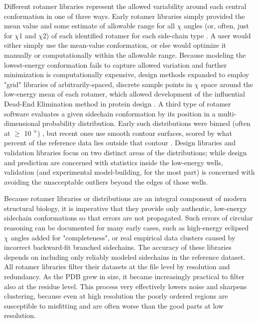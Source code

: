 Different rotamer libraries represent the allowed variability around each central conformation in one of three ways. Early rotamer libraries simply provided the mean value and some estimate of allowable range for all $\chi$ angles (or, often, just for $\chi$1 and $\chi$2) of each identified rotamer for each side-chain type \cite{Ponder1987, Tuffery1991,Schrauber1993}.  A user would either simply use the mean-value conformation, or else would optimize it manually or computationally within the allowable range. Because modeling the lowest-energy conformation fails to capture allowed variation and further minimization is computationally expensive, design methods expanded to employ "grid" libraries of arbitrarily-spaced, discrete sample points in $\chi$ space around the low-energy mean of each rotamer, which allowed development of the influential Dead-End Elimination method in protein design \cite{DeMaeyer1997,Gainza2013}.  A third type of rotamer software \cite{Chen:2010kx,Dunbrack1997} evaluates a given sidechain conformation by its position in a multi-dimensional probability distribution. Early such distributions were binned (often at $\ge$ 10 $\degree$) \cite{Laskowski:gl0276}, but recent ones use smooth contour surfaces, scored by what percent of the reference data lies outside that contour \cite{lovell2000penultimate, Read2011}. Design libraries and validation libraries focus on two distinct areas of the distributions; while design and prediction are concerned with statistics inside the low-energy wells, validation (and experimental model-building, for the most part) is concerned with avoiding the unacceptable outliers beyond the edges of those wells.

Because rotamer libraries or distributions are an integral component of modern structural biology, it is imperative that they provide only authentic, low-energy sidechain conformations so that errors are not propagated. Such errors of circular reasoning can be documented \cite{lovell2000penultimate} for many early cases, such as high-energy eclipsed $\chi$ angles added for "completeness", or real empirical data clusters caused by incorrect backward-fit branched sidechains. The accuracy of these libraries depends on including only reliably modeled sidechains in the reference dataset. All rotamer libraries filter their datasets at the file level by resolution and redundancy. As the PDB grew in size, it  became increasingly practical to filter also at the residue level. This process very effectively lowers noise and sharpens clustering, because even at high resolution the poorly ordered regions are susceptible to misfitting and are often worse than the good parts at low resolution.


